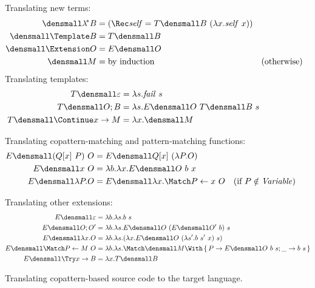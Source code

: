 \begin{figure}[t]
\centering
\small
Translating new terms:  
\begin{align*}
  \den{\lamstar B}
  &=
  (\Rec \mathit{self} = T\den{B} ~ (\lambda x. \mathit{self} ~ x))
  \\
  \den{\Template B}
  &=
  T\den{B}
  \\
  \den{\Extension O}
  &=
  E\den{O}
  \\
  \den{M}
  &=
  \text{by induction}
  &(\text{otherwise})
\end{align*}
Translating templates:
\begin{align*}
  T\den{\varepsilon}
  &=
  \lambda s. \mathit{fail}~s
  \\
  T\den{O; B}
  &=
  \lambda s. E\den{O} ~ T\den{B} ~ s
  \\
  T\den{\Continue x \to M}
  &=
  \lambda x. \den{M}
\end{align*}

Translating copattern-matching and pattern-matching functions:
\begin{align*}
  E\den{(Q[x] ~ P) ~ O}
  &=
  E\den{Q[x] ~ (\lambda P. O)}
  \\
  E\den{x ~ O}
  &=
  \lambda b. \lambda x. E\den{O} ~ b ~ x
  \\
  E\den{\lambda P. O}
  &=
  E\den{\lambda x. \Match P \gets x ~ O}
  &(\text{if } P \notin \mathit{Variable})
\end{align*}

Translating other extensions:
\begin{align*}
  E\den{\varepsilon}
  &=
  \lambda b. \lambda s. b ~ s
  \\
  E\den{O; O'}
  &=
  \lambda b. \lambda s. E\den{O} ~ (E\den{O'}~b) ~ s
  \\
  E\den{\lambda x. O}
  &=
  \lambda b. \lambda s. (\lambda x. E\den{O} ~ (\lambda s'. b ~ s' ~ x) ~ s)
  \\
  E\den{\Match P \gets M ~ O}
  &=
    \lambda b. \lambda s.
    \Match \den{M} \With \set{P \to E\den{O}~b~s; \_ \to b~s}
  \\
  E\den{\Try x \to B}
  &=
  \lambda x. T\den{B}
\end{align*}
\caption{Translating copattern-based source code to the target language.}
\label{fig:translation}
\end{figure}

